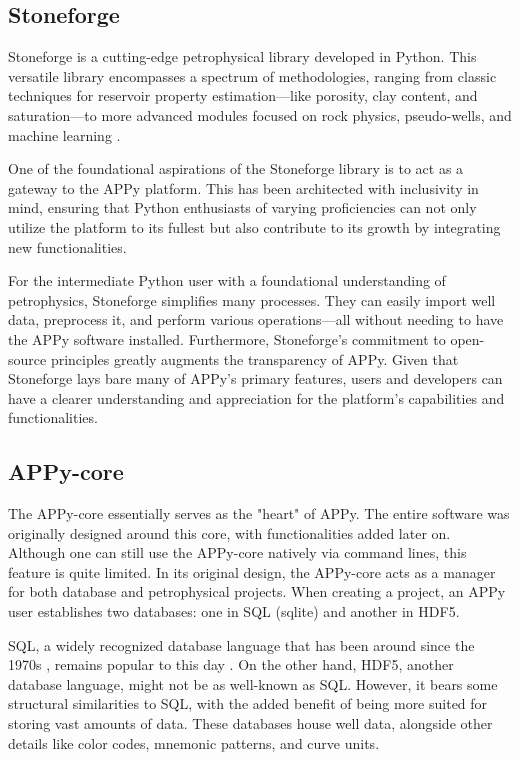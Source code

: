 \documentclass[10pt,twocolumn,twoside]{article}
\begin{document}
\subsection{Stoneforge}
Stoneforge is a cutting-edge petrophysical library developed in Python. This versatile library encompasses a spectrum of methodologies, ranging from classic techniques for reservoir property estimation—like porosity, clay content, and saturation—to more advanced modules focused on rock physics, pseudo-wells, and machine learning \citep{giecar2023}.

One of the foundational aspirations of the Stoneforge library is to act as a gateway to the APPy platform. This has been architected with inclusivity in mind, ensuring that Python enthusiasts of varying proficiencies can not only utilize the platform to its fullest but also contribute to its growth by integrating new functionalities.

For the intermediate Python user with a foundational understanding of petrophysics, Stoneforge simplifies many processes. They can easily import well data, preprocess it, and perform various operations—all without needing to have the APPy software installed. Furthermore, Stoneforge's commitment to open-source principles greatly augments the transparency of APPy. Given that Stoneforge lays bare many of APPy’s primary features, users and developers can have a clearer understanding and appreciation for the platform's capabilities and functionalities.

\subsection{APPy-core}
The APPy-core essentially serves as the "heart" of APPy. The entire software was originally designed around this core, with functionalities added later on. Although one can still use the APPy-core natively via command lines, this feature is quite limited. In its original design, the APPy-core acts as a manager for both database and petrophysical projects. When creating a project, an APPy user establishes two databases: one in SQL (sqlite) and another in HDF5.

SQL, a widely recognized database language that has been around since the 1970s \citep{boycechan1973}, remains popular to this day \citep{stackoverflow2022}. On the other hand, HDF5, another database language, might not be as well-known as SQL. However, it bears some structural similarities to SQL, with the added benefit of being more suited for storing vast amounts of data. These databases house well data, alongside other details like color codes, mnemonic patterns, and curve units.
\end{document}
